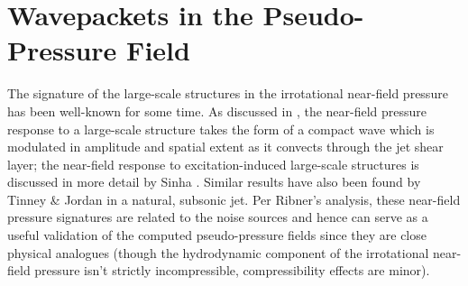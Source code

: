 \section{Wavepackets in the Pseudo-Pressure Field}
The signature of the large-scale structures in the irrotational near-field pressure has been well-known for some time.
As discussed in , the near-field pressure response to a large-scale structure takes the form of a compact wave which is modulated in amplitude and spatial extent as it convects through the jet shear layer; the near-field response to excitation-induced large-scale structures is discussed in more detail by Sinha \etal \citep{Sinha2012}.
Similar results have also been found by Tinney \& Jordan \citep{Tinney2008} in a natural, subsonic jet.
Per Ribner's analysis, these near-field pressure signatures are related to the noise sources and hence can serve as a useful validation of the computed pseudo-pressure fields since they are close physical analogues (though the hydrodynamic component of the irrotational near-field pressure isn't strictly incompressible, compressibility effects are minor). 
